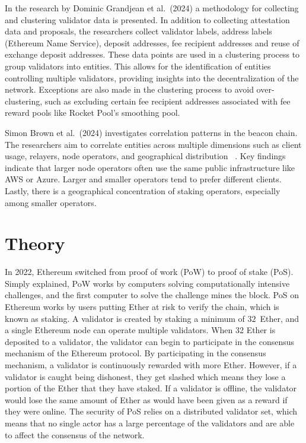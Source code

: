 \documentclass[runningheads]{llncs}
\begin{document}
In the research by Dominic Grandjean et al.~(2024) a methodology for collecting and clustering validator data is presented. In addition to collecting attestation data and proposals, the researchers collect validator labels, address labels (Ethereum Name Service), deposit addresses, fee recipient addresses and reuse of exchange deposit addresses. These data points are used in a clustering process to group validators into entities. This allows for the identification of entities controlling multiple validators, providing insights into the decentralization of the network. Exceptions are also made in the clustering process to avoid over-clustering, such as excluding certain fee recipient addresses associated with fee reward pools like Rocket Pool's smoothing pool.

Simon Brown et al.~(2024) investigates correlation patterns in the beacon chain. The researchers aim to correlate entities across multiple dimensions such as client usage, relayers, node operators, and geographical distribution ~\cite{brown2024exploring}. Key findings indicate that larger node operators often use the same public infrastructure like AWS or Azure. Larger and smaller operators tend to prefer different clients. Lastly, there is a geographical concentration of staking operators, especially among smaller operators. 

\section{Theory}

In 2022, Ethereum switched from proof of work (PoW) to proof of stake (PoS).
Simply explained, PoW works by computers solving computationally intensive challenges, and the first computer to solve the challenge mines the block. PoS on Ethereum works by users putting Ether at risk to verify the chain, which is known as staking.
A validator is created by staking a minimum of $32$~Ether, and a single Ethereum node can operate multiple validators. When 32 Ether is deposited to a validator, the validator can begin to participate in the consensus mechanism of the Ethereum protocol. By participating in the consensus mechanism, a validator is continuously rewarded with more Ether.
However, if a validator is caught being dishonest, they get slashed which means they lose a portion of the Ether that they have staked. If a validator is offline, the validator would lose the same amount of Ether as would have been given as a reward if they were online. The security of PoS relies on a distributed validator set, which means that no single actor has a large percentage of the validators and are able to affect the consensus of the network.
\end{document}
